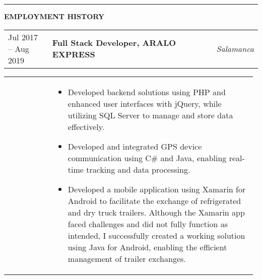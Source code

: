 \documentclass[letter,10pt]{article}
\begin{document}
\vspace{4.4mm}
\rule{\linewidth}{0.5pt}
\vspace{-4.3mm}
\par
\textbf{EMPLOYMENT HISTORY} \\
\vspace{-1mm}
\par
\begin{tabular}{@{} p{0.18\linewidth} p{0.686\linewidth} p{0.2\linewidth} @{}}
Jul 2017 -- Aug 2019 & \textbf{Full Stack Developer, ARALO EXPRESS}  & \textit{Salamanca}
\end{tabular}
\vspace{-3mm}
\par
\begin{tabular}{@{} p{0.18\linewidth} p{0.7965\linewidth} @{}}
&
\begin{itemize}[leftmargin=*, nosep]
	\item Developed backend solutions using PHP and enhanced user interfaces with jQuery, while utilizing SQL Server to manage and store data effectively.
    	\item Developed and integrated GPS device communication using C\# and Java, enabling real-time tracking and data processing.
    	\item Developed a mobile application using Xamarin for Android to facilitate the exchange of refrigerated and dry truck trailers. Although the Xamarin app faced challenges and did not fully function as intended, I successfully created a working solution using Java for Android, enabling the efficient management of trailer exchanges.
\end{itemize}
\end{tabular}

\vspace{0.75mm}
\end{document}
